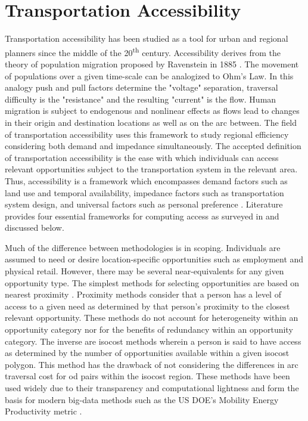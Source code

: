 \section*{Transportation Accessibility}

Transportation accessibility has been studied as a tool for urban and regional planners since the middle of the 20\textsuperscript{th} century. Accessibility derives from the theory of population migration proposed by Ravenstein in 1885 \cite{Ravenstein_1885}. The movement of populations over a given time-scale can be analogized to Ohm's Law. In this analogy push and pull factors determine the "voltage" separation, traversal difficulty is the "resistance" and the resulting "current" is the flow. Human migration is subject to endogenous and nonlinear effects as flows lead to changes in their origin and destination locations as well as on the arc between. The field of transportation accessibility uses this framework to study regional efficiency considering both demand and impedance simultaneously. The accepted definition of transportation accessibility is the ease with which individuals can access relevant opportunities subject to the transportation system in the relevant area. Thus, accessibility is a framework which encompasses demand factors such as land use and temporal availability, impedance factors such as transportation system design, and universal factors such as personal preference \cite{Geurs_2004}. Literature provides four essential frameworks for computing access as surveyed in \cite{Handy_1997, Kwan_1998, Geurs_2004, Miller_2018, Handy_2020} and discussed below.

Much of the difference between methodologies is in scoping. Individuals are assumed to need or desire location-specific opportunities such as employment and physical retail. However, there may be several near-equivalents for any given opportunity type. The simplest methods for selecting opportunities are based on nearest proximity \cite{Wachs_1973, Vickerman_1974}. Proximity methods consider that a person has a level of access to a given need as determined by that person's proximity to the closest relevant opportunity. These methods do not account for heterogeneity within an opportunity category nor for the benefits of redundancy within an opportunity category. The inverse are isocost methods wherein a person is said to have access as determined by the number of opportunities available within a given isocost polygon. This method has the drawback of not considering the differences in arc traversal cost for \gls{od} pairs within the isocost region. These methods have been used widely \cite{Easa_1993} due to their transparency and computational lightness and form the basis for modern big-data methods such as the US DOE's Mobility Energy Productivity metric \cite{Hou_2019}.

